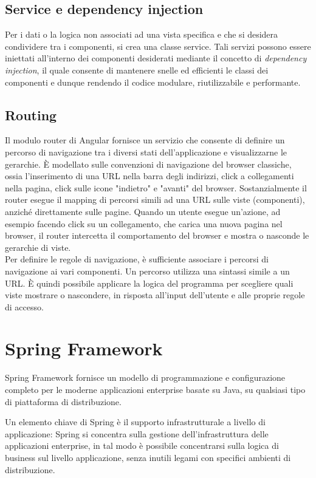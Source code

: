 \subsection{Service e dependency injection}
Per i dati o la logica non associati ad una vista specifica e che si desidera condividere tra i componenti, si crea una classe service. Tali servizi possono essere iniettati all'interno dei componenti desiderati mediante il concetto di \textit{dependency injection}, il quale consente di mantenere snelle ed efficienti le classi dei componenti e dunque rendendo il codice modulare, riutilizzabile e performante.

\subsection{Routing}    
Il modulo router di Angular fornisce un servizio che consente di definire un percorso di navigazione tra i diversi stati dell'applicazione e visualizzarne le gerarchie. È modellato sulle convenzioni di navigazione del browser classiche, ossia l'inserimento di una URL nella barra degli indirizzi, click a collegamenti nella pagina, click sulle icone "indietro" e "avanti" del browser. Sostanzialmente il router esegue il mapping di percorsi simili ad una URL sulle viste (componenti), anziché direttamente sulle pagine. Quando un utente esegue un'azione, ad esempio facendo click su un collegamento, che carica una nuova pagina nel browser, il router intercetta il comportamento del browser e mostra o nasconde le gerarchie di viste.\\
Per definire le regole di navigazione, è sufficiente associare i percorsi di navigazione ai vari componenti. Un percorso utilizza una sintassi simile a un URL. È quindi possibile applicare la logica del programma per scegliere quali viste mostrare o nascondere, in risposta all'input dell'utente e alle proprie regole di accesso.

\section{Spring Framework} \label{appendix:spring}
Spring Framework fornisce un modello di programmazione e configurazione completo per le moderne applicazioni enterprise basate su Java, su qualsiasi tipo di piattaforma di distribuzione.

Un elemento chiave di Spring è il supporto infrastrutturale a livello di applicazione: Spring si concentra sulla gestione dell'infrastruttura delle applicazioni enterprise, in tal modo è possibile concentrarsi sulla logica di business sul livello applicazione, senza inutili legami con specifici ambienti di distribuzione.

